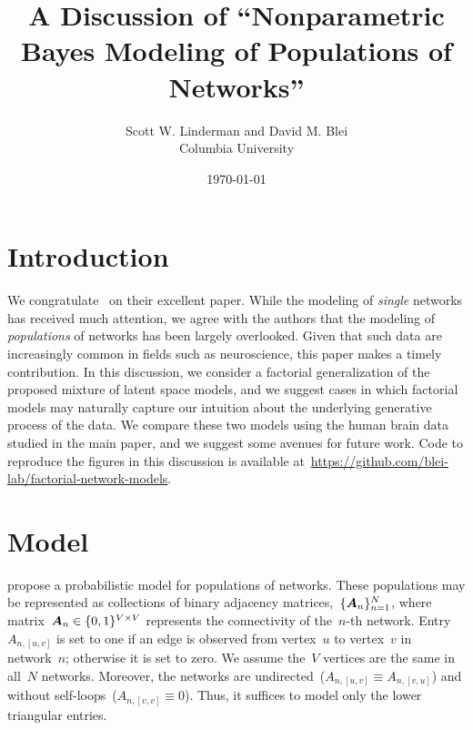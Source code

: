 



\title{A Discussion of ``Nonparametric Bayes Modeling of Populations of Networks''}
\author{
  Scott W. Linderman and David M. Blei\\
  Columbia University
}
\date{\today}


\maketitle


\section{Introduction}

We congratulate~\citet{durante2016nonparametric} on their excellent paper.  While the
modeling of \emph{single} networks has received much attention, we agree
with the authors that the modeling of \emph{populations} of
networks has been largely overlooked.  Given that such data are
increasingly common in fields such as neuroscience, this paper makes a
timely contribution.  In this discussion, we consider a factorial
generalization of the proposed mixture of latent space models,
and we suggest cases in which factorial
models may naturally capture our intuition about the
underlying generative process of the data. We compare these two models using the
human brain data studied in the main paper, and we suggest some
avenues for future work.  Code to reproduce the figures in this
discussion is available
at~\url{https://github.com/blei-lab/factorial-network-models}.

\section{Model}
\citet{durante2016nonparametric}
propose a probabilistic model for populations of networks. These populations
may be represented as collections of binary adjacency matrices,~$\{\boldsymbol{A}_n\}_{n=1}^N$,
where matrix~${\boldsymbol{A}_n \in \{0,1\}^{V \times V}}$ represents the
connectivity of the~$n$-th network.  Entry~${A_{n,[u,v]}}$ is set to
one if an edge is observed from vertex~$u$ to vertex~$v$ in
network~$n$; otherwise it is set to zero.  We assume the~$V$ vertices
are the same in all~$N$ networks.  Moreover, the networks are
undirected~(${A_{n,[u,v]} \equiv A_{n,[v,u]}}$) and without
self-loops~(${A_{n,[v,v]} \equiv 0}$). Thus, it suffices to model only
the lower triangular entries.

